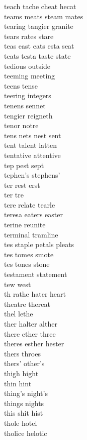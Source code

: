 teach tache cheat hecat\\
teams meats steam mates\\
tearing tangier granite\\
tears rates stare\\
teas east eats esta seat\\
teats testa taste state\\
tedious outside\\
teeming meeting\\
teens tense\\
teering integers \\
tenens sennet\\
tengier reigneth \\
tenor notre\\
tens nets nest sent\\
tent talent latten  \\
tentative attentive\\
tep pest sept \\
tephen's stephens' \\
ter rest erst \\
ter tre\\
tere relate tearle  \\
teresa eaters easter\\
terine reunite \\
terminal tramline\\
tes staple petals pleats   \\
tes tomes smote  \\
tes tones stone  \\
testament statement\\
tew west \\
th rathe hater heart   \\
theatre thereat\\
thel lethe \\
ther halter alther  \\
there ether three\\
theres esther hester\\
thers throes \\
thers' other's \\
thigh hight\\
thin hint\\
thing's night's\\
things nights\\
this shit hist\\
thole hotel\\
tholice helotic\\

